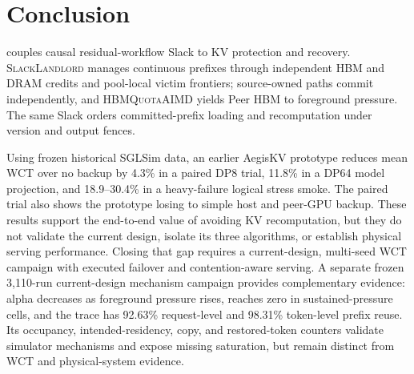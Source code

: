 \section{Conclusion}
\label{sec:conclusion}

\system{} couples causal residual-workflow Slack to KV protection and recovery.
\textsc{SlackLandlord} manages continuous prefixes through independent HBM and
DRAM credits and pool-local victim frontiers; source-owned paths commit
independently, and \textsc{HBMQuotaAIMD} yields Peer HBM to foreground
pressure.  The same Slack orders committed-prefix loading and recomputation
under version and output fences.

Using frozen historical SGLSim data, an earlier AegisKV prototype reduces
mean WCT over no backup by 4.3\% in a paired DP8 trial, 11.8\% in a DP64 model
projection, and 18.9--30.4\% in a heavy-failure logical stress smoke.  The
paired trial also shows the prototype losing to simple host and peer-GPU
backup.  These results support the end-to-end value of avoiding KV
recomputation, but they do not validate the current design, isolate its three
algorithms, or establish physical serving performance.  Closing that gap
requires a current-design, multi-seed WCT campaign with executed failover and
contention-aware serving.  A separate frozen 3,110-run current-design
mechanism campaign provides complementary evidence: alpha decreases as
foreground pressure rises, reaches zero in sustained-pressure cells, and the
trace has 92.63\% request-level and 98.31\% token-level prefix reuse.  Its
occupancy, intended-residency, copy, and restored-token counters validate
simulator mechanisms and expose missing saturation, but remain distinct from
WCT and physical-system evidence.
